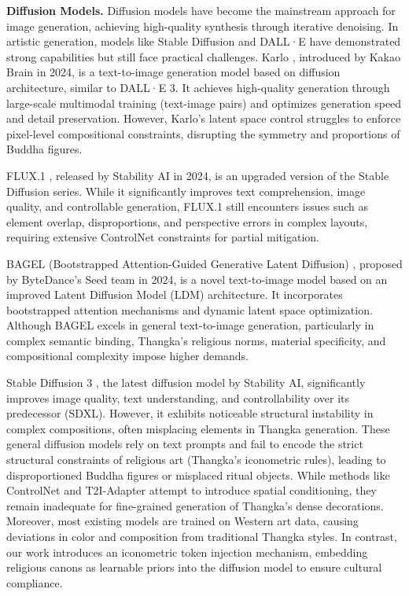 \documentclass[sn-mathphys]{sn-jnl}%
\theoremstyle{thmstyleone}%
\theoremstyle{thmstyletwo}%
\theoremstyle{thmstylethree}%
\begin{document}
\textbf{Diffusion Models.} Diffusion models have become the mainstream approach for image generation, achieving high-quality synthesis through iterative denoising. In artistic generation, models like Stable Diffusion \cite{b19} and DALL·E \cite{b20} have demonstrated strong capabilities but still face practical challenges. Karlo \cite{b21}, introduced by Kakao Brain in 2024, is a text-to-image generation model based on diffusion architecture, similar to DALL·E 3. It achieves high-quality generation through large-scale multimodal training (text-image pairs) and optimizes generation speed and detail preservation. However, Karlo's latent space control struggles to enforce pixel-level compositional constraints, disrupting the symmetry and proportions of Buddha figures.

FLUX.1 \cite{b22}, released by Stability AI in 2024, is an upgraded version of the Stable Diffusion series. While it significantly improves text comprehension, image quality, and controllable generation, FLUX.1 still encounters issues such as element overlap, disproportions, and perspective errors in complex layouts, requiring extensive ControlNet constraints for partial mitigation.

BAGEL (Bootstrapped Attention-Guided Generative Latent Diffusion) \cite{b23}, proposed by ByteDance's Seed team in 2024, is a novel text-to-image model based on an improved Latent Diffusion Model (LDM) architecture. It incorporates bootstrapped attention mechanisms and dynamic latent space optimization. Although BAGEL excels in general text-to-image generation, particularly in complex semantic binding, Thangka's religious norms, material specificity, and compositional complexity impose higher demands.

Stable Diffusion 3 \cite{b24}, the latest diffusion model by Stability AI, significantly improves image quality, text understanding, and controllability over its predecessor (SDXL). However, it exhibits noticeable structural instability in complex compositions, often misplacing elements in Thangka generation. These general diffusion models rely on text prompts and fail to encode the strict structural constraints of religious art (Thangka's iconometric rules), leading to disproportioned Buddha figures or misplaced ritual objects. While methods like ControlNet \cite{b25} and T2I-Adapter \cite{b26} attempt to introduce spatial conditioning, they remain inadequate for fine-grained generation of Thangka's dense decorations. Moreover, most existing models are trained on Western art data, causing deviations in color and composition from traditional Thangka styles. In contrast, our work introduces an iconometric token injection mechanism, embedding religious canons as learnable priors into the diffusion model to ensure cultural compliance.
\end{document}
